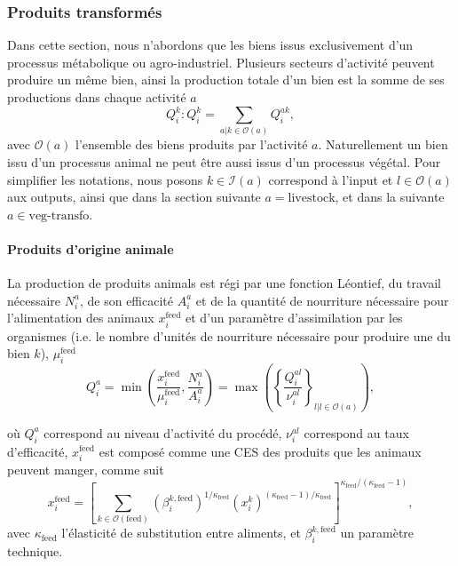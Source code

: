 \subsubsection{Produits transformés}
Dans cette section, nous n’abordons que les biens issus exclusivement d’un processus métabolique ou agro-industriel. Plusieurs secteurs d’activité peuvent produire un même bien, ainsi la production totale d’un bien est la somme de ses productions dans chaque activité $a$
\begin{equation}\label{eq_qik}
    Q_i^k: Q_i^k = \sum_{a|k\in \mathcal{O}(a)} Q_i^{ak},
\end{equation}
avec $\mathcal{O}(a)$ l’ensemble des biens produits par l’activité $a$. Naturellement un bien issu d’un processus animal ne peut être aussi issus d’un processus végétal. Pour simplifier les notations, nous posons $k \in \mathcal{I}(a)$ correspond à l’input et $l \in \mathcal{O}(a)$ aux outputs, ainsi que dans la section suivante $a = \text{livestock}$, et dans la suivante $a \in \text{veg-transfo}$.

\paragraph{Produits d’origine animale} La production de produits animals est régi par une fonction Léontief, du travail nécessaire $N_i^a$, de son efficacité $A_i^a$ et de la quantité de nourriture nécessaire pour l’alimentation des animaux $x_i^\text{feed}$ et d’un paramètre d’assimilation par les organismes (i.e. le nombre d’unités de nourriture nécessaire pour produire une du bien $k$), $\mu_i^\text{feed}$
\begin{equation}\label{eq_qlivestock}
    Q_i^a = \min \left(\frac{x^{\text{feed}}_i}{\mu^{\text{feed}}_i}, \frac{N_i^a}{A_i^a}\right) = \max \left( \left\{ \frac{Q_i^{al}}{\nu^{al}_i} \right\}_{l|l\in\mathcal{O}(a)} \right),
\end{equation}

où $Q_i^a$ correspond au niveau d’activité du procédé, $\nu_i^{al}$ correspond au taux d’efficacité, $x_i^\text{feed}$ est composé comme une CES des produits que les animaux peuvent manger, comme suit
\begin{equation}
    x_i^\text{feed} = \left[ \sum_{k \in \mathcal{O}(\text{feed})} (\beta_i^{k, \text{feed}})^{1/\kappa_\text{feed}} (x_i^k)^{(\kappa_{\text{feed}} - 1) / \kappa_{\text{feed}}}  \right]^{\kappa_{\text{feed}}/(\kappa_{\text{feed}} - 1)},
\end{equation}
avec $\kappa_{\text{feed}}$ l’élasticité de substitution entre aliments, et $\beta_i^{k, \text{feed}}$ un paramètre technique.

